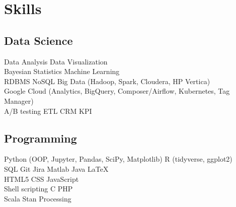 \documentclass[]{deedy-resume-openfont}
\begin{document}
\begin{minipage}[t]{0.33\textwidth}

\section{Skills}
\subsection{Data Science}
Data Analysis \textbullet{} Data Visualization \\
Bayesian Statistics \textbullet{} Machine Learning \\
RDBMS \textbullet{} NoSQL \textbullet{}
Big Data (Hadoop, Spark, Cloudera, HP Vertica) \\
Google Cloud (Analytics, BigQuery, Composer/Airflow, Kubernetes, Tag Manager) \\
A/B testing \textbullet{} ETL \textbullet{} CRM \textbullet{} KPI \\
\sectionsep
\subsection{Programming}
Python (OOP, Jupyter, Pandas, SciPy, Matplotlib) \textbullet{} R (tidyverse, ggplot2) \\
SQL \textbullet{} Git \textbullet{} Jira \textbullet{} Matlab \textbullet{} Java \textbullet{} \LaTeX \\ 
HTML5 \textbullet{} CSS \textbullet{} JavaScript \\
Shell scripting \textbullet{} C \textbullet{} PHP \\
Scala \textbullet{} Stan \textbullet{} Processing
\sectionsep

%
%

\end{minipage} 
\hfill
\end{document}
